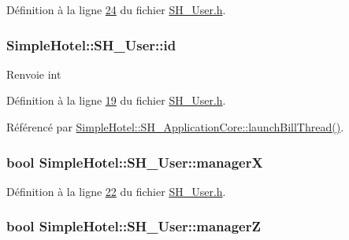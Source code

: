 Définition à la ligne \hyperlink{SH__User_8h_source_l00024}{24} du fichier \hyperlink{SH__User_8h_source}{S\-H\-\_\-\-User.\-h}.

\hypertarget{classSimpleHotel_1_1SH__User_a492697af8401a2d22b0ecefab4d78da5}{
\subsubsection[{id}]{\setlength{\rightskip}{0pt plus 5cm}Simple\-Hotel\-::\-S\-H\-\_\-\-User\-::id\hspace{0.3cm}{\ttfamily [read]}}}\label{classSimpleHotel_1_1SH__User_a492697af8401a2d22b0ecefab4d78da5}
\begin{DoxyReturn}{Renvoie}
int 
\end{DoxyReturn}


Définition à la ligne \hyperlink{SH__User_8h_source_l00019}{19} du fichier \hyperlink{SH__User_8h_source}{S\-H\-\_\-\-User.\-h}.



Référencé par \hyperlink{classSimpleHotel_1_1SH__ApplicationCore_a5e72b1bc2e023f4fc5c2f5dd2ab75b2a}{Simple\-Hotel\-::\-S\-H\-\_\-\-Application\-Core\-::launch\-Bill\-Thread()}.

\hypertarget{classSimpleHotel_1_1SH__User_ac9a48dc5b684b5f4a700a7c4991e759d}{
\subsubsection[{manager\-X}]{\setlength{\rightskip}{0pt plus 5cm}bool Simple\-Hotel\-::\-S\-H\-\_\-\-User\-::manager\-X\hspace{0.3cm}{\ttfamily [read]}}}\label{classSimpleHotel_1_1SH__User_ac9a48dc5b684b5f4a700a7c4991e759d}


Définition à la ligne \hyperlink{SH__User_8h_source_l00022}{22} du fichier \hyperlink{SH__User_8h_source}{S\-H\-\_\-\-User.\-h}.

\hypertarget{classSimpleHotel_1_1SH__User_addccc353716a6f4cf15f08ad1a06d2dc}{
\subsubsection[{manager\-Z}]{\setlength{\rightskip}{0pt plus 5cm}bool Simple\-Hotel\-::\-S\-H\-\_\-\-User\-::manager\-Z\hspace{0.3cm}{\ttfamily [read]}}}\label{classSimpleHotel_1_1SH__User_addccc353716a6f4cf15f08ad1a06d2dc}


